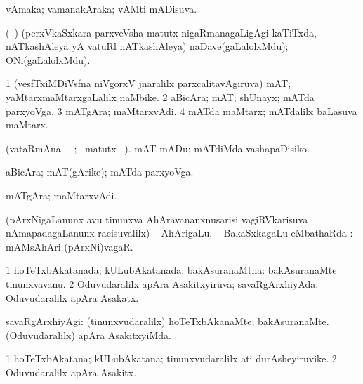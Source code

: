 {{{{{{{{{{{{{{\bentry
{} 
\gl{\gu}
\expl{}
\bmng
vAmaka; vamanakAraka; vAMti mADisuva. 
\emng
\eentry

\bentry 
{} 
\gl{\nA}
\bmng
 (\roV\ \pArxkatx) (perxVkaSxkara parxveVsha matutx nigaRmanagaLigAgi kaTiTxda, nATkashAleya yA vatuRl nATkashAleya) naDave(gaLalolxMdu); ONi(gaLalolxMdu). 
\emng
\eentry

\bentry 
{} 
\gl{\nA}
\expl{}
\bmng
\bnum
\num{1} (vesfTxiMDiVsfna niVgorxV jnaralilx parxcalitavAgiruva) mAT, yaMtarxmaMtarxgaLalilx naMbike. 
\num{2} aBicAra; mAT; shUnayx; mATda parxyoVga. 
\num{3} mATgAra; maMtarxvAdi. 
\num{4} mATda maMtarx; mATdalilx baLasuva maMtarx. 
\enum
\emng
\eentry

\bentry
{} 
\gl{\sakirx}(vataRmAna \parxpu\ \Eva\ ; \BU\ matutx
\BUkaq\ ). \bmng
 mAT mADu; mATdiMda vashapaDisiko. 
\emng
\eentry

\bentry 
{} 
\gl{\nA}
\expl{}
\bmng
 aBicAra; mAT(gArike); mATda parxyoVga. 
\emng
\eentry

\bentry 
{} 
\gl{\nA}
\expl{}
\bmng
 mATgAra; maMtarxvAdi. 
\emng
\eentry

\bentry 
{} 
\gl{\saupa}
\expl{}
\bmng
 (pArxNigaLanunx avu tinunxva AhAravananxnusarisi vagiRVkarisuva nAmapadagaLanunx racisuvalilx) -- AhArigaLu, -- BakaSxkagaLu eMbathaRda \saupa :  mAMsAhAri (pArxNi)vagaR. 
\emng
\eentry

\bentry
{} 
\gl{\gu}
\expl{}
\bmng
\bnum
\num{1} hoTeTxbAkatanada; kULubAkatanada; bakAsuranaMtha:  bakAsuranaMte tinunxvavanu. 
\num{2} Oduvudaralilx apAra Asakitxyiruva; savaRgArxhiyAda:  Oduvudaralilx apAra Asakatx. 
\enum
\emng
\eentry

\bentry
{} 
\gl{\kirxvi}
\expl{}
\bmng
savaRgArxhiyAgi: 
\banum
{} (tinunxvudaralilx) hoTeTxbAkanaMte; bakAsuranaMte. 
 (Oduvudaralilx) apAra AsakitxyiMda. 
\eanum
\emng
\eentry

\bentry 
{} 
\gl{\nA}
\expl{}
\bmng
\bnum
\num{1} hoTeTxbAkatana; kULubAkatana; tinunxvudaralilx ati durAsheyiruvike. 
\num{2} Oduvudaralilx apAra Asakitx. 
\enum
\emng
\eentry

}}}}}}}}}}}}}}
